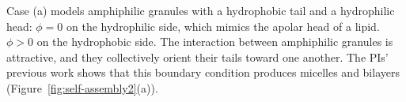 Case (a) models amphiphilic granules with
a hydrophobic tail and a hydrophilic head: $\phi =0$ on the hydrophilic side,
which mimics the apolar head of a lipid.
$\phi >0$ on the hydrophobic side. 
The interaction between amphiphilic granules is attractive, and they
collectively orient their tails toward one another.  The PIs' previous
work shows that this   boundary condition produces micelles and
bilayers~\cite{Fu2018_SIAM} (Figure~\ref{fig:self-assembly2}(a)).



